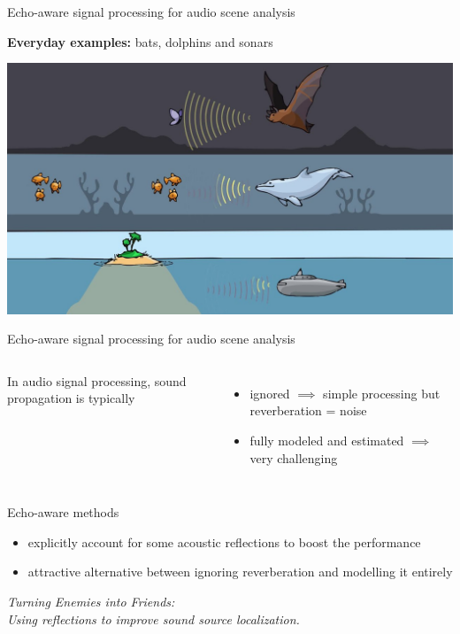 \begin{frame}[t]{\alert{Echo-aware} signal processing for audio scene analysis}

    \textbf{Everyday examples:} bats, dolphins and sonars

    \begin{center}
        \includegraphics[width=\textwidth]{figures/echo_nature.jpg}
    \end{center}

\end{frame}

\begin{frame}{\alert{Echo-aware} signal processing for audio scene analysis}


    \begin{columns}[onlytextwidth]
        In audio signal processing, sound propagation is typically
        \begin{itemize}
            \item \alert{ignored} $\implies$ simple processing but reverberation = noise
            \item \alert{fully modeled} and estimated $\implies$ very challenging
        \end{itemize}

    \end{columns}

    \begin{mydefblock}{Echo-aware methods}
        \begin{itemize}
            \item explicitly account for some acoustic reflections to boost the performance
            \item attractive alternative between ignoring reverberation and modelling it entirely
        \end{itemize}
        \begin{center}
            \textit{Turning Enemies into Friends:
            \\Using reflections to improve sound source localization.}
        \end{center}
        \hfill \cite{ribeiro2010turning}
    \end{mydefblock}



\end{frame}

